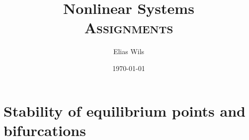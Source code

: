 \documentclass[a4paper,11pt]{article}
\title{Nonlinear Systems \\[1ex]
    \Large \textsc{Assignments}}
\author{Elias Wils}
\date{\today}
\begin{document}
\maketitle
\newpage
\tableofcontents

\newpage
\section{Stability of equilibrium points and bifurcations}    
\end{document}

